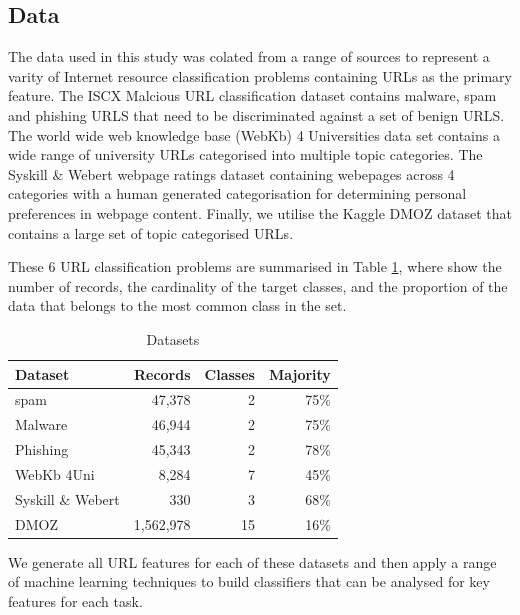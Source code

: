 \documentclass[sigconf]{acmart}
\begin{document}
\subsection{Data}

The data used in this study was colated from a range of sources to represent a varity of 
Internet resource classification problems containing URLs as the primary feature.
The ISCX Malcious URL classification dataset contains malware, spam and phishing URLS 
that need to be discriminated against a set of benign URLS\cite{Mamun2016}.
The world wide web knowledge base (WebKb) 4 Universities data set contains a wide
range of university URLs categorised into multiple topic categories\cite{Craven1998}.
The Syskill \& Webert webpage ratings dataset containing webepages across 4 categories
with a human generated categorisation for determining personal preferences in webpage
content\cite{Pazzani1996}. Finally, we utilise the Kaggle DMOZ dataset that contains 
a large set of topic categorised URLs\cite{dmoz}.

These 6 URL classification problems are summarised in Table \ref{tab:data}, where
show the number of records, the cardinality of the target classes, and the proportion
of the data that belongs to the most common class in the set.

\begin{table}
\caption{Datasets}
\label{tab:data}
\begin{tabular}{|l|r|r|r|}
\toprule
Dataset              &Records        &Classes  &Majority    \\
\midrule
spam                 &47,378          &2       &75\%        \\
Malware              &46,944          &2       &75\%        \\
Phishing             &45,343          &2       &78\%        \\
WebKb 4Uni           &8,284           &7       &45\%        \\
Syskill \& Webert    &330             &3       &68\%        \\
DMOZ                 &1,562,978       &15      &16\%        \\
\bottomrule
\end{tabular}
\end{table}

We generate all URL features for each of these datasets and then apply a range of machine learning
techniques to build classifiers that can be analysed for key features for each task. 
\end{document}
